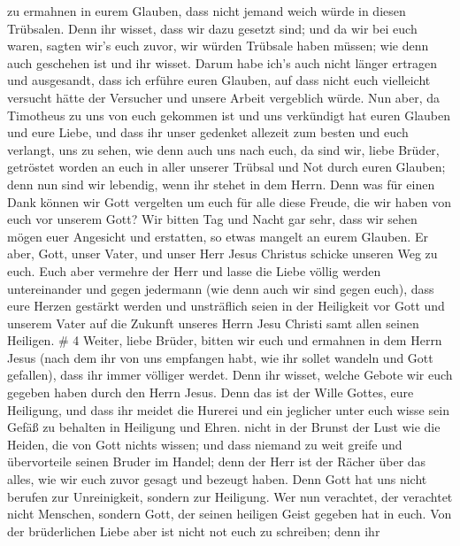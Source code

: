 zu ermahnen in eurem Glauben,  dass nicht jemand weich würde
in diesen Trübsalen. Denn ihr wisset, dass wir dazu gesetzt sind;
 und da wir bei euch waren, sagten wir's euch zuvor, wir
würden Trübsale haben müssen; wie denn auch geschehen ist und ihr
wisset.  Darum habe ich's auch nicht länger ertragen und
ausgesandt, dass ich erführe euren Glauben, auf dass nicht euch
vielleicht versucht hätte der Versucher und unsere Arbeit vergeblich
würde.  Nun aber, da Timotheus zu uns von euch gekommen ist
und uns verkündigt hat euren Glauben und eure Liebe, und dass ihr unser
gedenket allezeit zum besten und euch verlangt, uns zu sehen, wie denn
auch uns nach euch,  da sind wir, liebe Brüder, getröstet
worden an euch in aller unserer Trübsal und Not durch euren Glauben;
 denn nun sind wir lebendig, wenn ihr stehet in dem Herrn.
 Denn was für einen Dank können wir Gott vergelten um euch
für alle diese Freude, die wir haben von euch vor unserem Gott?
 Wir bitten Tag und Nacht gar sehr, dass wir sehen mögen
euer Angesicht und erstatten, so etwas mangelt an eurem Glauben.
 Er aber, Gott, unser Vater, und unser Herr Jesus Christus
schicke unseren Weg zu euch.  Euch aber vermehre der Herr
und lasse die Liebe völlig werden untereinander und gegen jedermann (wie
denn auch wir sind gegen euch),  dass eure Herzen gestärkt
werden und unsträflich seien in der Heiligkeit vor Gott und unserem
Vater auf die Zukunft unseres Herrn Jesu Christi samt allen seinen
Heiligen. \# 4  Weiter, liebe Brüder, bitten wir euch und
ermahnen in dem Herrn Jesus (nach dem ihr von uns empfangen habt, wie
ihr sollet wandeln und Gott gefallen), dass ihr immer völliger werdet.
 Denn ihr wisset, welche Gebote wir euch gegeben haben durch
den Herrn Jesus.  Denn das ist der Wille Gottes, eure
Heiligung, und dass ihr meidet die Hurerei  und ein
jeglicher unter euch wisse sein Gefäß zu behalten in Heiligung und
Ehren.  nicht in der Brunst der Lust wie die Heiden, die von
Gott nichts wissen;  und dass niemand zu weit greife und
übervorteile seinen Bruder im Handel; denn der Herr ist der Rächer über
das alles, wie wir euch zuvor gesagt und bezeugt haben. 
Denn Gott hat uns nicht berufen zur Unreinigkeit, sondern zur Heiligung.
 Wer nun verachtet, der verachtet nicht Menschen, sondern
Gott, der seinen heiligen Geist gegeben hat in euch.  Von
der brüderlichen Liebe aber ist nicht not euch zu schreiben; denn ihr
